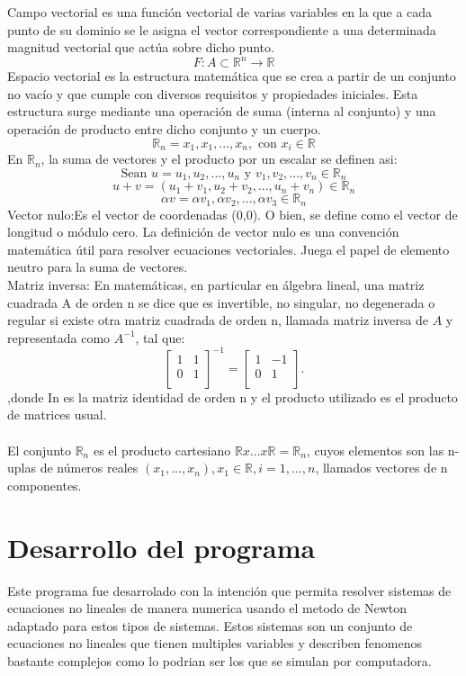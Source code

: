 \documentclass[11pt]{article}
\begin{document}
Campo vectorial es una función vectorial de varias variables en la que a cada punto de su dominio se le asigna el vector correspondiente a una determinada magnitud vectorial que actúa sobre dicho punto.$$F:A\subset\mathbb{R}^n \longrightarrow \mathbb{R}$$ 
Espacio vectorial es la estructura matemática que se crea a partir de un conjunto no vacío y que cumple con diversos requisitos y propiedades iniciales. Esta estructura surge mediante una operación de suma (interna al conjunto) y una operación de producto entre dicho conjunto y un cuerpo.
$$\mathbb{R}_n={x_1,x_1,...,x_n},\textrm{ con } x_i\in \mathbb{R}$$
En $\mathbb{R}_n$, la suma de vectores y el producto por un escalar se definen asi:
$$\textrm{Sean } u=u_1,u_2,...,u_n \textrm{ y }  v_1,v_2,...,v_n \in \mathbb{R}_n$$
$$u+v=(u_1+v_1,u_2+v_2,...,u_n+v_n)\in \mathbb{R}_n$$
$$\alpha v=\alpha v_1,\alpha v_2,...,\alpha v_3 \in \mathbb{R}_n$$
Vector nulo:Es el vector de coordenadas (0,0). O bien, se define como el vector de longitud o módulo cero. La definición de vector nulo es una convención matemática útil para resolver ecuaciones vectoriales. Juega el papel de elemento neutro para la suma de vectores.\\

Matriz inversa: En matemáticas, en particular en álgebra lineal, una matriz cuadrada A de orden n se dice que es invertible, no singular, no degenerada o regular si existe otra matriz cuadrada de orden n, llamada matriz inversa de $A$ y representada como $A^{-1}$, tal que:
$$\begin{bmatrix} 1 & 1 \\ 0 & 1 \\ \end{bmatrix}^{-1} = \begin{bmatrix} 1 & -1 \\ 0 & 1 \\ \end{bmatrix}.$$
 ,donde In es la matriz identidad de orden n y el producto utilizado es el producto de matrices usual.\\
 \\El conjunto $\mathbb{R}_n$ es el producto cartesiano $\mathbb{R}x...x\mathbb{R}=\mathbb{R}_n$, cuyos elementos son las n-uplas de números reales $(x_1,...,x_n), x_1 \in \mathbb{R},i=1,...,n$, llamados vectores de n componentes.


\section{Desarrollo del programa}
Este programa fue desarrolado con la intención que permita resolver sistemas de ecuaciones no lineales de manera numerica usando el metodo de Newton adaptado para estos tipos de sistemas. Estos sistemas son un conjunto de ecuaciones no lineales que tienen multiples variables y describen fenomenos bastante complejos como lo podrian ser los que se simulan por computadora. 
\end{document}
